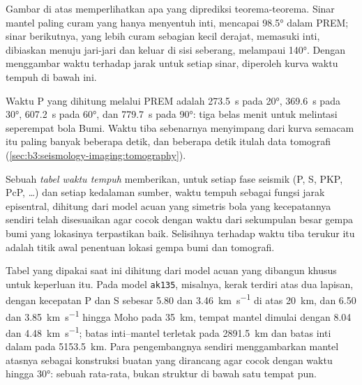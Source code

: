 Gambar di atas memperlihatkan apa yang diprediksi teorema-teorema. Sinar mantel paling curam yang
hanya menyentuh inti, mencapai \ang{98.5} dalam PREM; sinar berikutnya, yang lebih
curam sebagian kecil derajat, memasuki inti, dibiaskan menuju jari-jari dan
keluar di sisi seberang, melampaui \ang{140}. Dengan menggambar waktu terhadap jarak untuk
setiap sinar, diperoleh kurva waktu tempuh di bawah ini.

Waktu P yang dihitung melalui PREM adalah \qty{273.5}{s} pada \ang{20},
\qty{369.6}{s} pada \ang{30}, \qty{607.2}{s} pada \ang{60}, dan \qty{779.7}{s} pada
\ang{90}: tiga belas menit untuk melintasi seperempat bola Bumi.
Waktu tiba sebenarnya menyimpang dari kurva semacam itu paling banyak beberapa detik, dan beberapa detik
itulah data tomografi (\cref{sec:b3:seismology-imaging:tomography}).

\begin{definition}\label{def:b3:seismology-imaging:tables}
Sebuah \emph{tabel waktu tempuh} memberikan, untuk setiap fase seismik
(P, S, PKP, PcP, \dots) dan setiap kedalaman sumber, waktu tempuh sebagai
fungsi jarak episentral, dihitung dari model acuan yang simetris bola
yang kecepatannya sendiri telah disesuaikan agar cocok dengan waktu dari sekumpulan
besar gempa bumi yang lokasinya terpastikan baik. Selisihnya terhadap waktu tiba
terukur itu adalah titik awal penentuan lokasi gempa bumi dan tomografi.
\end{definition}

Tabel yang dipakai saat ini dihitung dari model acuan yang dibangun khusus untuk
keperluan itu. Pada model \texttt{ak135}, misalnya, kerak terdiri atas dua lapisan,
dengan kecepatan P dan S sebesar 5.80 dan \qty{3.46}{km.s^{-1}} di atas \qty{20}{km}, dan
6.50 dan \qty{3.85}{km.s^{-1}} hingga Moho pada \qty{35}{km}, tempat
mantel dimulai dengan 8.04 dan \qty{4.48}{km.s^{-1}}; batas inti--mantel terletak
pada \qty{2891.5}{km} dan batas inti dalam pada \qty{5153.5}{km}.
Para pengembangnya sendiri menggambarkan mantel atasnya sebagai konstruksi buatan
yang dirancang agar cocok dengan waktu hingga \ang{30}: sebuah rata-rata, bukan struktur di bawah
satu tempat pun.

